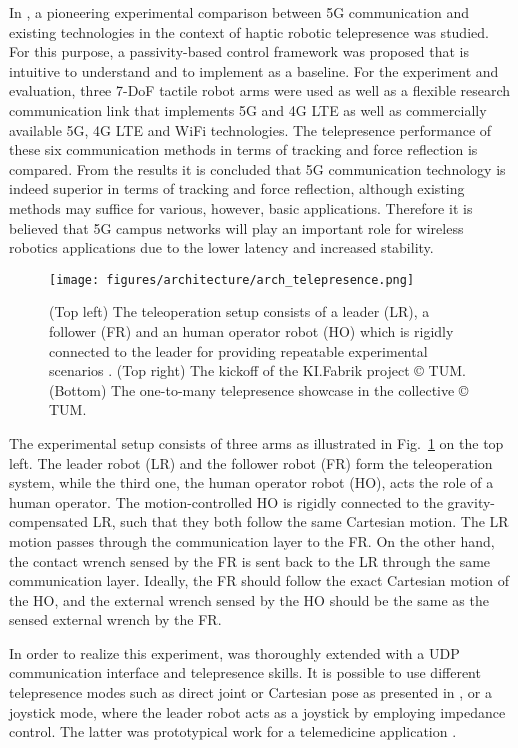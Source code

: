 In \cite{chen2022communication}, a pioneering experimental comparison between 5G communication and existing technologies in the context of haptic robotic telepresence was studied.
For this purpose, a passivity-based control framework was proposed that is intuitive to understand and to implement as a baseline. 
For the experiment and evaluation, three 7-DoF tactile robot arms were used as well as a flexible research communication link that implements 5G and 4G LTE as well as commercially available 5G, 4G LTE and WiFi technologies.
The telepresence performance of these six communication methods in terms of tracking and force reflection is compared.
From the results it is concluded that 5G communication technology is indeed superior in terms of tracking and force reflection, although existing methods may suffice for various, however, basic applications.
Therefore it is believed that 5G campus networks will play an important role for wireless robotics applications due to the lower latency and increased stability.

\begin{figure}[ht!]
\texttt{[image: figures/architecture/arch\_telepresence.png]}
\caption{(Top left) The teleoperation setup consists of a leader (LR), a
follower (FR) and an human operator robot (HO) which
is rigidly connected to the leader for providing repeatable
experimental scenarios \cite{chen2022communication}. (Top right) The kickoff of the KI.Fabrik project \copyright{} TUM. (Bottom) The one-to-many telepresence showcase in the collective \copyright{} TUM.}
\label{fig:architecture:system:telepresence}
\end{figure}

The experimental setup consists of three \platformname{} arms \cite{Haddadin.2022} as illustrated in Fig.~\ref{fig:architecture:system:telepresence} on the top left.
The leader robot (LR) and the follower robot (FR) form the teleoperation system, while the third one, the human operator robot (HO), acts the role of a human operator.
The motion-controlled HO is rigidly connected to the gravity-compensated LR, such that they both follow the same Cartesian motion.
The LR motion passes through the communication layer to the FR.
On the other hand, the contact wrench sensed by the FR is sent back to the LR through the same communication layer.
Ideally, the FR should follow the exact Cartesian motion of the HO, and the external wrench sensed by the HO should be the same as the sensed external wrench by the FR.

In order to realize this experiment, \softwareabbr{} was thoroughly extended with a UDP communication interface and telepresence skills.
It is possible to use different telepresence modes such as direct joint or Cartesian pose as presented in \cite{chen2022communication}, or a joystick mode, where the leader robot acts as a joystick by employing impedance control.
The latter was prototypical work for a telemedicine application \cite{naceri2022tactile}.

